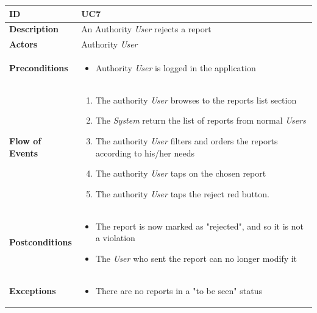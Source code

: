 




\begin{table}[H]
\begin{tabular}{|l|p{}|}
\hline
\textbf{ID}             & UC7                                                                             \\ \hline
\textbf{Description}    & An Authority \textit{User} rejects a report \\ \hline
\textbf{Actors}         &  Authority \textit{User}                                                                       \\ \hline

\textbf{Preconditions}  &   \begin{itemize}

 \item Authority \textit{User} is logged in the application
                 \end{itemize}     
                    \\ \hline
                    
\textbf{Flow of Events} &   \begin{enumerate}
    \item The authority \textit{User} browses to the reports list section
    \item The \textit{System} return the list of reports from normal \textit{Users}
    \item The authority \textit{User} filters and orders the reports according to his/her needs
    \item The authority \textit{User} taps on the chosen report
    \item The authority \textit{User} taps the reject red button.

\end{enumerate}                                                                             \\ \hline
\textbf{Postconditions} & \begin{itemize}
     
 \item The report is now marked as "rejected", and so it is not a violation
 \item The \textit{User} who sent the report can no longer modify it 
 \end{itemize}\\ \hline

\textbf{Exceptions} &    \begin{itemize}
    \item There are no reports in a "to be seen" status
   

\end{itemize}
  
                           \\ \hline

\end{tabular}
\end{table}





